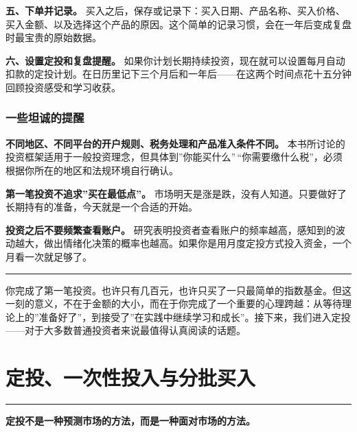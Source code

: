 \documentclass[a4paper,11pt,oneside,fontset=none,UTF8,zihao=-4]{ctexbook}
\begin{document}
\textbf{五、下单并记录。}
买入之后，保存或记录下：买入日期、产品名称、买入价格、买入金额、以及选择这个产品的原因。这个简单的记录习惯，会在一年后变成复盘时最宝贵的原始数据。

\textbf{六、设置定投和复盘提醒。}
如果你计划长期持续投资，现在就可以设置每月自动扣款的定投计划。在日历里记下三个月后和一年后------在这两个时间点花十五分钟回顾投资感受和学习收获。

\subsection{一些坦诚的提醒}\label{ux4e00ux4e9bux5766ux8bdaux7684ux63d0ux9192}

\textbf{不同地区、不同平台的开户规则、税务处理和产品准入条件不同。}
本书所讨论的投资框架适用于一般投资理念，但具体到''你能买什么''\,``你需要缴什么税''，必须根据你所在的地区和法规环境自行确认。

\textbf{第一笔投资不追求''买在最低点''。}
市场明天是涨是跌，没有人知道。只要做好了长期持有的准备，今天就是一个合适的开始。

\textbf{投资之后不要频繁查看账户。}
研究表明投资者查看账户的频率越高，感知到的波动越大，做出情绪化决策的概率也越高。如果你是用月度定投方式投入资金，一个月看一次就足够了。

\begin{center}{\color{dh-bronze}\rule{0.2\textwidth}{0.5pt}}\end{center}

你完成了第一笔投资。也许只有几百元，也许只买了一只最简单的指数基金。但这一刻的意义，不在于金额的大小，而在于你完成了一个重要的心理跨越：从等待理论上的''准备好了''，到接受了''在实践中继续学习和成长''。接下来，我们进入定投------对于大多数普通投资者来说最值得认真阅读的话题。

\newpage

\chapter{定投、一次性投入与分批买入}\label{ux5b9aux6295ux4e00ux6b21ux6027ux6295ux5165ux4e0eux5206ux6279ux4e70ux5165}

\begin{center}{\color{dh-bronze}\rule{0.2\textwidth}{0.5pt}}\end{center}

\begin{dhquote}
\textbf{定投不是一种预测市场的方法，而是一种面对市场的方法。}
\end{dhquote}
\end{document}
